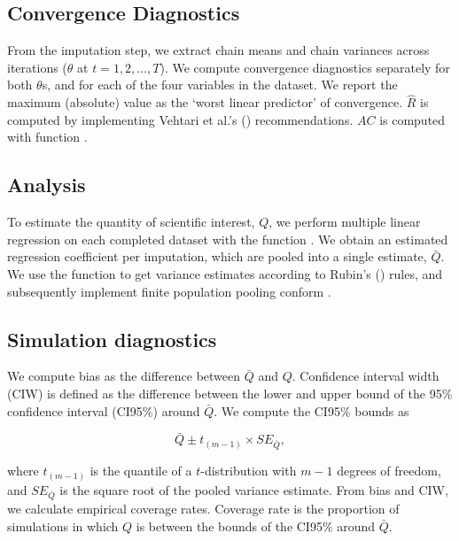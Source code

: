 \documentclass[article]{jss}
\newcommand{\fct}[1]{\code{#1()}}
\begin{document}
\subsection{Convergence Diagnostics}

From the imputation step, we extract chain means and chain variances across iterations ($\theta$ at $t = 1,2,\dots,T$).  
We compute convergence diagnostics separately for both $\theta$s, and for each of the four variables in the dataset. We report the maximum (absolute) value as the `worst linear predictor' of convergence. $\widehat{R}$ is computed by implementing Vehtari et al.'s (\citeyear{veht19}) recommendations. $AC$ is computed with function \fct{stats::acf}.

\subsection{Analysis}

To estimate the quantity of scientific interest, $Q$, we perform multiple linear regression on each completed dataset with the function \fct{stats::lm}. We obtain an estimated regression coefficient per imputation, which are pooled into a single estimate, $\bar{Q}$. We use the function \fct{mice::pool} to get variance estimates according to Rubin's (\citeyear{rubin87}) rules, and subsequently implement finite population pooling conform \cite{vink14}.

\subsection{Simulation diagnostics}

We compute bias as the difference between $\bar{Q}$ and $Q$. Confidence interval width (CIW) is defined as the difference between the lower and upper bound of the 95\% confidence interval (CI95\%) around $\bar{Q}$. We compute the CI95\% bounds as 

$$\bar{Q} \pm t_{(m-1)} \times SE_{\bar{Q}},$$

where $t_{(m-1)}$ is the quantile of a $t$-distribution with $m-1$ degrees of freedom, and $SE_{\bar{Q}}$ is the square root of the pooled variance estimate. From bias and CIW, we calculate empirical coverage rates. Coverage rate is the proportion of simulations in which $Q$ is between the bounds of the CI95\% around $\bar{Q}$. 
\end{document}

